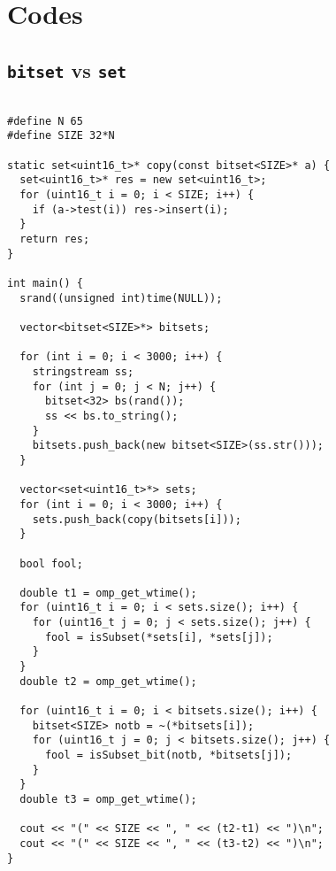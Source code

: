 \appendix
\section{Codes}
\subsection{\texttt{bitset} vs \texttt{set}}
\label{app:setbench}
\begin{verbatim}

#define N 65
#define SIZE 32*N

static set<uint16_t>* copy(const bitset<SIZE>* a) {
  set<uint16_t>* res = new set<uint16_t>;
  for (uint16_t i = 0; i < SIZE; i++) {
    if (a->test(i)) res->insert(i);
  }
  return res;
}

int main() {
  srand((unsigned int)time(NULL));

  vector<bitset<SIZE>*> bitsets;

  for (int i = 0; i < 3000; i++) {
    stringstream ss;
    for (int j = 0; j < N; j++) {
      bitset<32> bs(rand());
      ss << bs.to_string();
    }
    bitsets.push_back(new bitset<SIZE>(ss.str()));
  }

  vector<set<uint16_t>*> sets;
  for (int i = 0; i < 3000; i++) {
    sets.push_back(copy(bitsets[i]));
  }

  bool fool;

  double t1 = omp_get_wtime();
  for (uint16_t i = 0; i < sets.size(); i++) {
    for (uint16_t j = 0; j < sets.size(); j++) {
      fool = isSubset(*sets[i], *sets[j]);
    }
  }
  double t2 = omp_get_wtime();

  for (uint16_t i = 0; i < bitsets.size(); i++) {
    bitset<SIZE> notb = ~(*bitsets[i]);
    for (uint16_t j = 0; j < bitsets.size(); j++) {
      fool = isSubset_bit(notb, *bitsets[j]);
    }
  }
  double t3 = omp_get_wtime();

  cout << "(" << SIZE << ", " << (t2-t1) << ")\n";
  cout << "(" << SIZE << ", " << (t3-t2) << ")\n";
}

\end{verbatim}

